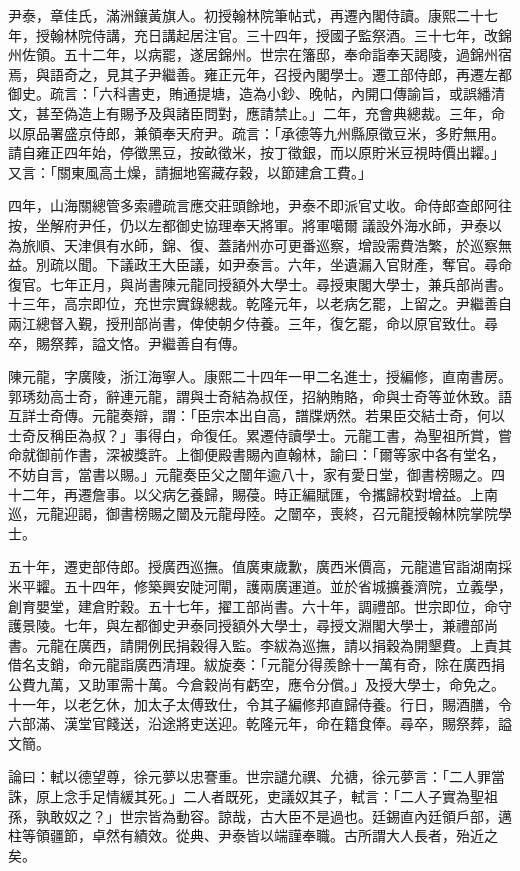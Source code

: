 \begin{pinyinscope}
尹泰，章佳氏，滿洲鑲黃旗人。初授翰林院筆帖式，再遷內閣侍讀。康熙二十七年，授翰林院侍講，充日講起居注官。三十四年，授國子監祭酒。三十七年，改錦州佐領。五十二年，以病罷，遂居錦州。世宗在籓邸，奉命詣奉天謁陵，過錦州宿焉，與語奇之，見其子尹繼善。雍正元年，召授內閣學士。遷工部侍郎，再遷左都御史。疏言：「六科書吏，賄通提塘，造為小鈔、晚帖，內開口傳諭旨，或誤繙清文，甚至偽造上有賜予及與諸臣問對，應請禁止。」二年，充會典總裁。三年，命以原品署盛京侍郎，兼領奉天府尹。疏言：「承德等九州縣原徵豆米，多貯無用。請自雍正四年始，停徵黑豆，按畝徵米，按丁徵銀，而以原貯米豆視時價出糶。」又言：「關東風高土燥，請掘地窖藏存穀，以節建倉工費。」

四年，山海關總管多索禮疏言應交莊頭餘地，尹泰不即派官丈收。命侍郎查郎阿往按，坐解府尹任，仍以左都御史協理奉天將軍。將軍噶爾議設外海水師，尹泰以為旅順、天津俱有水師，錦、復、蓋諸州亦可更番巡察，增設需費浩繁，於巡察無益。別疏以聞。下議政王大臣議，如尹泰言。六年，坐遺漏入官財產，奪官。尋命復官。七年正月，與尚書陳元龍同授額外大學士。尋授東閣大學士，兼兵部尚書。十三年，高宗即位，充世宗實錄總裁。乾隆元年，以老病乞罷，上留之。尹繼善自兩江總督入覲，授刑部尚書，俾使朝夕侍養。三年，復乞罷，命以原官致仕。尋卒，賜祭葬，謚文恪。尹繼善自有傳。

陳元龍，字廣陵，浙江海寧人。康熙二十四年一甲二名進士，授編修，直南書房。郭琇劾高士奇，辭連元龍，謂與士奇結為叔侄，招納賄賂，命與士奇等並休致。語互詳士奇傳。元龍奏辯，謂：「臣宗本出自高，譜牒炳然。若果臣交結士奇，何以士奇反稱臣為叔？」事得白，命復任。累遷侍讀學士。元龍工書，為聖祖所賞，嘗命就御前作書，深被獎許。上御便殿書賜內直翰林，諭曰：「爾等家中各有堂名，不妨自言，當書以賜。」元龍奏臣父之闓年逾八十，家有愛日堂，御書榜賜之。四十二年，再遷詹事。以父病乞養歸，賜葠。時正編賦匯，令攜歸校對增益。上南巡，元龍迎謁，御書榜賜之闓及元龍母陸。之闓卒，喪終，召元龍授翰林院掌院學士。

五十年，遷吏部侍郎。授廣西巡撫。值廣東歲歉，廣西米價高，元龍遣官詣湖南採米平糶。五十四年，修築興安陡河閘，護兩廣運道。並於省城擴養濟院，立義學，創育嬰堂，建倉貯穀。五十七年，擢工部尚書。六十年，調禮部。世宗即位，命守護景陵。七年，與左都御史尹泰同授額外大學士，尋授文淵閣大學士，兼禮部尚書。元龍在廣西，請開例民捐穀得入監。李紱為巡撫，請以捐穀為開墾費。上責其借名支銷，命元龍詣廣西清理。紱旋奏：「元龍分得羨餘十一萬有奇，除在廣西捐公費九萬，又助軍需十萬。今倉穀尚有虧空，應令分償。」及授大學士，命免之。十一年，以老乞休，加太子太傅致仕，令其子編修邦直歸侍養。行日，賜酒膳，令六部滿、漢堂官餞送，沿途將吏送迎。乾隆元年，命在籍食俸。尋卒，賜祭葬，謚文簡。

論曰：軾以德望尊，徐元夢以忠謇重。世宗譴允禩、允禟，徐元夢言：「二人罪當誅，原上念手足情緩其死。」二人者既死，吏議奴其子，軾言：「二人子實為聖祖孫，孰敢奴之？」世宗皆為動容。諒哉，古大臣不是過也。廷錫直內廷領戶部，邁柱等領疆節，卓然有績效。從典、尹泰皆以端謹奉職。古所謂大人長者，殆近之矣。


\end{pinyinscope}
